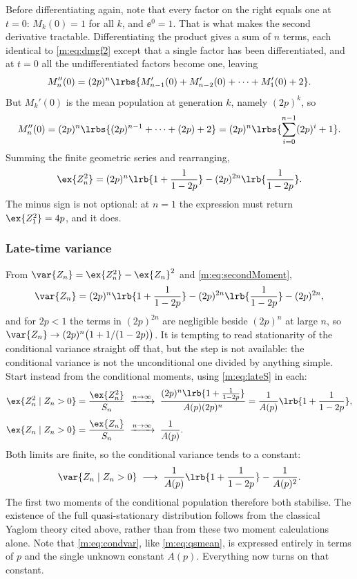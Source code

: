 Before differentiating again, note that every factor on the right equals one at
$t=0$: $M_k(0)=1$ for all $k$, and $\ee^0=1$. That is what makes the second
derivative tractable. Differentiating the product gives a sum of $n$ terms, each
identical to \cref{m:eq:dmgf2} except that a single factor has been differentiated,
and at $t=0$ all the undifferentiated factors become one, leaving
\begin{equation*}
M_n''(0) = (2p)^n\lrbs{M_{n-1}'(0) + M_{n-2}'(0) + \cdots + M_1'(0) + 2}.
\end{equation*}
But $M_k'(0)$ is the mean population at generation $k$, namely $(2p)^k$, so
\begin{equation*}
M_n''(0) = (2p)^n\lrbs{(2p)^{n-1} + \cdots + (2p) + 2}
= (2p)^n\lrbs{\sum_{i=0}^{n-1}(2p)^i + 1}.
\end{equation*}
Summing the finite geometric series and rearranging,
\begin{equation}
\label{m:eq:secondMoment}
\ex{Z_n^2} = (2p)^n\lrb{1+\frac{1}{1-2p}} - (2p)^{2n}\lrb{\frac{1}{1-2p}} .
\end{equation}
The minus sign is not optional: at $n=1$ the expression must return
$\ex{Z_1^2}=4p$, and it does.

\subsubsection{Late-time variance}

From $\var{Z_n} = \ex{Z_n^2}-\ex{Z_n}^2$ and \cref{m:eq:secondMoment},
\begin{equation*}
\var{Z_n} = (2p)^n\lrb{1+\frac{1}{1-2p}} - (2p)^{2n}\lrb{\frac{1}{1-2p}} - (2p)^{2n},
\end{equation*}
and for $2p<1$ the terms in $(2p)^{2n}$ are negligible beside $(2p)^n$ at large
$n$, so $\var{Z_n}\to(2p)^n\bigl(1+1/(1-2p)\bigr)$. It is tempting to read
stationarity of the conditional variance straight off that, but the step is not
available: the conditional variance is not the unconditional one divided by
anything simple. Start instead from the conditional moments, using
\cref{m:eq:lateS} in each:
\begin{align*}
\ex{Z_n^2\mid Z_n>0} &= \frac{\ex{Z_n^2}}{S_n}
\;\xrightarrow{n\to\infty}\;
\frac{(2p)^n\lrb{1+\frac{1}{1-2p}}}{A(p)(2p)^n}
= \frac{1}{A(p)}\lrb{1+\frac{1}{1-2p}},\\[4pt]
\ex{Z_n\mid Z_n>0} &= \frac{\ex{Z_n}}{S_n}
\;\xrightarrow{n\to\infty}\;
\frac{1}{A(p)} .
\end{align*}
Both limits are finite, so the conditional variance tends to a constant:
\begin{equation}
\label{m:eq:condvar}
\var{Z_n\mid Z_n>0} \;\longrightarrow\;
\frac{1}{A(p)}\lrb{1+\frac{1}{1-2p}} - \frac{1}{A(p)^2} .
\end{equation}
The first two moments of the conditional population therefore both stabilise.  The
existence of the full quasi-stationary distribution follows from the classical
Yaglom theory cited above, rather than from these two moment calculations alone.
Note that \cref{m:eq:condvar}, like \cref{m:eq:qsmean}, is expressed
entirely in terms of $p$ and the single unknown constant $A(p)$. Everything now
turns on that constant.

